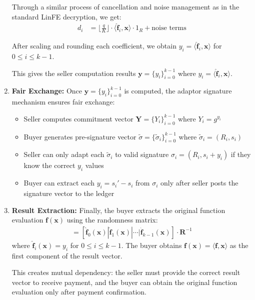\begin{enumerate}
    Through a similar process of cancellation and noise management as in the standard LinFE decryption, we get:
    \begin{align*}
        d_i &= \lfloor \frac{q}{K} \rfloor \cdot \langle \mathbf{\hat{f}}_i, \mathbf{x} \rangle \cdot 1_R + \text{noise terms}
    \end{align*}
    
    After scaling and rounding each coefficient, we obtain $y_i = \langle \mathbf{\hat{f}}_i, \mathbf{x} \rangle$ for $0 \leq i \leq k-1$.
    
    This gives the seller computation results $\mathbf{y} = \{y_i\}_{i=0}^{k-1}$ where $y_i = \langle \mathbf{\hat{f}}_i, \mathbf{x} \rangle$.
    
    \item \textbf{Fair Exchange:} Once $\mathbf{y} = \{y_i\}_{i=0}^{k-1}$ is computed, the adaptor signature mechanism ensures fair exchange:
    \begin{itemize}
        \item Seller computes commitment vector $\mathbf{Y} = \{Y_i\}_{i=0}^{k-1}$ where $Y_i = g^{y_i}$
        \item Buyer generates pre-signature vector $\widetilde{\sigma} = \{\widetilde{\sigma}_i\}_{i=0}^{k-1}$ where $\widetilde{\sigma}_i = (R_i, s_i)$
        \item Seller can only adapt each $\widetilde{\sigma}_i$ to valid signature $\sigma_i = (R_i, s_i+y_i)$ if they know the correct $y_i$ values
        \item Buyer can extract each $y_i = s_i' - s_i$ from $\sigma_i$ only after seller posts the signature vector to the ledger
    \end{itemize}

    \item \textbf{Result Extraction:} Finally, the buyer extracts the original function evaluation $\mathbf{f}(\mathbf{x})$ using the randomness matrix:
    \begin{align*}
        [\mathbf{f}(\mathbf{x})|\mathbf{f}_1(\mathbf{x})|\cdots|\mathbf{f}_{k-1}(\mathbf{x})] = [\mathbf{\hat{f}}_0(\mathbf{x})|\mathbf{\hat{f}}_1(\mathbf{x})|\cdots|\mathbf{\hat{f}}_{k-1}(\mathbf{x})] \cdot \mathbf{R}^{-1}
    \end{align*}
    where $\mathbf{\hat{f}}_i(\mathbf{x}) = y_i$ for $0 \leq i \leq k-1$. The buyer obtains $\mathbf{f}(\mathbf{x}) = \langle \mathbf{f}, \mathbf{x} \rangle$ as the first component of the result vector.
    
    This creates mutual dependency: the seller must provide the correct result vector to receive payment, and the buyer can obtain the original function evaluation only after payment confirmation.
\end{enumerate}

